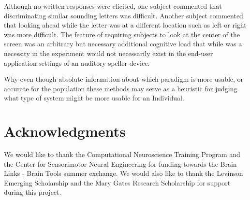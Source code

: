 \documentclass[10pt]{article}
\begin{document}
Although no written responses were elicited, one subject commented
that discriminating similar sounding letters was difficult.  Another
subject commented that looking ahead while the letter was at a
different location such as left or right was more difficult.  The
feature of requiring subjects to look at the center of the screen
was an arbitrary but necessary additional cognitive load that while
was a necessity in the experiment would not necessarily exist in the
end-user application settings of an auditory speller device.

Why even though absolute information about which paradigm is more
usable, or accurate for the population these methods may serve as a
heuristic for judging what type of system might be more usable for
an Individual.

\section{Acknowledgments}
We would like to thank the Computational Neuroscience Training Program
and the Center for Sensorimotor Neural Engineering for funding towards
the Brain Links - Brain Tools summer exchange. We would also like to
thank the Levinson Emerging Scholarship and the Mary Gates Research
Scholarship for support during this project.

\clearpage    
\begin{spacing}{.865}
\footnotesize{

}
\end{spacing}
\end{document}
